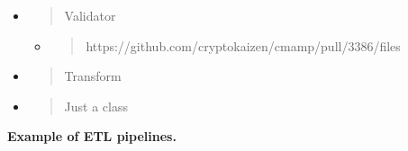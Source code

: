 \documentclass[11pt, reqno]{amsart}
\begin{document}
\begin{itemize}
\item
  \begin{quote}
  Validator
  \end{quote}

  \begin{itemize}
  \item
    \begin{quote}
    https://github.com/cryptokaizen/cmamp/pull/3386/files
    \end{quote}
  \end{itemize}
\end{itemize}

\begin{itemize}
\item
  \begin{quote}
  Transform
  \end{quote}
\end{itemize}

\begin{itemize}
\item
  \begin{quote}
  Just a class
  \end{quote}
\end{itemize}

\textbf{Example of ETL pipelines.}
\end{document}
